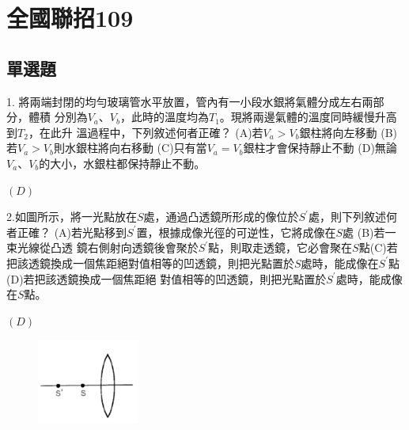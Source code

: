 \documentclass[cn,10pt,math=newtx]{elegantbook}
\begin{document}
\newpage


\chapter{全國聯招109}
\section{單選題}

\begin{example}
   1. 將兩端封閉的均勻玻璃管水平放置，管內有一小段水銀將氣體分成左右兩部分，體積
分別為$V_a、V_b$，此時的溫度均為$T_1$。現將兩邊氣體的溫度同時緩慢升高到$T_2$，在此升
溫過程中，下列敘述何者正確？ (A)若$V_a >V_b$銀柱將向左移動 (B)若$V_a > V_b$則水銀柱將向右移動 (C)只有當$V_a = V_b$銀柱才會保持靜止不動 (D)無論$V_a 、 V_b$的大小，水銀柱都保持靜止不動。\\
    \rightline{[高雄聯招教甄109]}
\end{example}
\begin{solution}
    $(D)$
    \end{solution}

\newpage

\begin{example}
   2.如圖所示，將一光點放在$S$處，通過凸透鏡所形成的像位於$S^{'}$處，則下列敘述何者正確？ 
(A)若光點移到$S^{'}$置，根據成像光徑的可逆性，它將成像在$S$處 (B)若一束光線從凸透
鏡右側射向透鏡後會聚於$S^{'}$點，則取走透鏡，它必會聚在$S$點(C)若把該透鏡換成一個焦距絕對值相等的凹透鏡，則把光點置於$S$處時，能成像在$S^{'}$點 (D)若把該透鏡換成一個焦距絕
對值相等的凹透鏡，則把光點置於$S^{'}$處時，能成像在$S$點。
\\
    \rightline{[全國聯招教甄109]}
\end{example}
\begin{solution}
    $(D)$
\end{solution}
\begin{figure}[htbp]
    \flushright
    \includegraphics[width=0.3\textwidth]{image/109全國2.png}
  \end{figure}
\newpage
\end{document}
